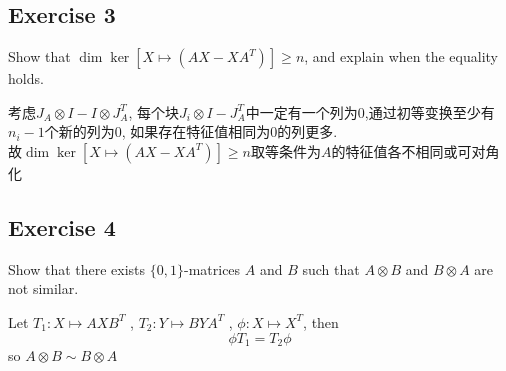 \documentclass[11pt]{ctexart}
\theoremstyle{definition}
\numberwithin{equation}{section}
\theoremstyle{definition}
\theoremstyle{remark}
\begin{document}
\subsection{Exercise 3}
Show that $\dim \ker [X \mapsto (AX - XA^T)] \geq n$, and explain when the equality holds.
\begin{aaa}
    考虑$J_A\otimes I - I\otimes J_A^T$, 每个块$J_i\otimes I-J_A^T$中一定有一个列为0,通过初等变换至少有$n_i-1$个新的列为0, 如果存在特征值相同为0的列更多.\\
    故$\dim \ker [X \mapsto (AX - XA^T)] \geq n$取等条件为$A$的特征值各不相同或可对角化
\end{aaa}
\subsection{Exercise 4}
    Show that there exists $\{0,1\}$-matrices $A$ and $B$ such that $A\otimes B$ and $B\otimes A$ are not similar.
\begin{aaa}
   Let $T_1:X\mapsto AXB^T$ , $T_2:Y\mapsto BYA^T$ ,  $\phi: X\mapsto X^T$, then \[\phi T_1=T_2\phi\] so $A\otimes B\sim B\otimes A$
\end{aaa}
\end{document}
